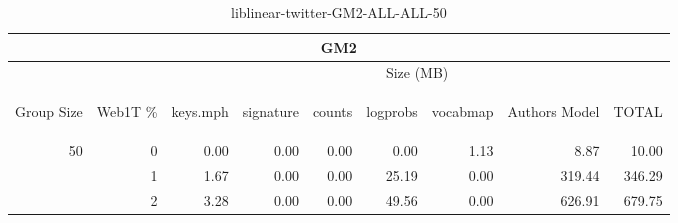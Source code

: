 \begin{center}
\begin{table}[htbp]
\begin{tabular}{ | r | r | r | r | r | r | r | r | r |}
\hline
\multicolumn{9}{|c|}{GM2}\\
\hline
 & & \multicolumn{7}{|c|}{Size (MB)}\\ \cline{3-9}
\begin{sideways}Group Size\end{sideways} & \begin{sideways}Web1T \% \end{sideways} & \begin{sideways}keys.mph\end{sideways} & \begin{sideways}signature\end{sideways} & \begin{sideways}counts\end{sideways} & \begin{sideways}logprobs\end{sideways} & \begin{sideways}vocabmap\end{sideways} & \begin{sideways}Authors Model \end{sideways} & \begin{sideways}TOTAL\end{sideways}\\
\hline
\multirow{2}{*}{50}
 & 0 & 0.00 & 0.00 & 0.00 & 0.00 & 1.13 & 8.87 & 10.00\\ \cline{2-9}
 & 1 & 1.67 & 0.00 & 0.00 & 25.19 & 0.00 & 319.44 & 346.29\\ \cline{2-9}
 & 2 & 3.28 & 0.00 & 0.00 & 49.56 & 0.00 & 626.91 & 679.75\\ \cline{2-9}
\hline
\end{tabular}
\caption{liblinear-twitter-GM2-ALL-ALL-50}
\label{table:liblinear-twitter-GM2-ALL-ALL-50}
\end{table}
\end{center}

